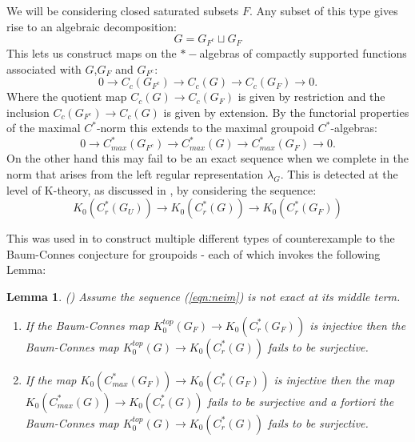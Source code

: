 \documentclass[11pt]{amsart}
\theoremstyle{plain}
\newtheorem{lemma}[theorem]{Lemma}%
\theoremstyle{definition}%
\theoremstyle{remark}%
\begin{document}
We will be considering closed saturated subsets $F$. Any subset of this type gives rise to an algebraic decomposition:
\begin{equation*}
G = G_{F^{c}}\sqcup G_{F}
\end{equation*}
This lets us construct maps on the $*-$algebras of compactly supported functions associated with $G$,$G_{F}$ and $G_{F^{c}}$:
\begin{equation*}
0 \rightarrow C_{c}(G_{F^{c}}) \rightarrow C_{c}(G) \rightarrow C_{c}(G_{F}) \rightarrow 0.
\end{equation*}
Where the quotient map $C_{c}(G) \rightarrow C_{c}(G_{F})$ is given by restriction and the inclusion $C_{c}(G_{F^{c}}) \rightarrow C_{c}(G)$ is given by extension. By the functorial properties of the maximal $C^{*}$-norm this extends to the maximal groupoid $C^{*}$-algebras:
\begin{equation*}
0 \rightarrow C_{max}^{*}(G_{F^{c}}) \rightarrow C_{max}^{*}(G) \rightarrow C_{max}^{*}(G_{F}) \rightarrow 0.
\end{equation*}
On the other hand this may fail to be an exact sequence when we complete in the norm that arises from the left regular representation $\lambda_{G}$. This is detected at the level of K-theory, as discussed in \cite{MR1911663}, by considering the sequence:
\begin{equation}\label{eqn:neim}
K_{0}(C^{*}_{r}(G_{U}))\rightarrow K_{0}(C^{*}_{r}(G)) \rightarrow K_{0}(C^{*}_{r}(G_{F}))
\end{equation}

This was used in \cite{MR1911663} to construct multiple different types of counterexample to the Baum-Connes conjecture for groupoids - each of which invokes the following Lemma:
\begin{lemma}\label{Lem:Lemma1}(\cite[Lemma 1]{MR1911663})
Assume the sequence (\ref{eqn:neim}) is not exact at its middle term.
\begin{enumerate}
\item If the Baum-Connes map $K_{0}^{top}(G_{F}) \rightarrow K_{0}(C^{*}_{r}(G_{F}))$ is injective then the Baum-Connes map $K_{0}^{top}(G) \rightarrow K_{0}(C^{*}_{r}(G))$ fails to be surjective.
\item If the map $K_{0}(C^{*}_{max}(G_{F})) \rightarrow K_{0}(C^{*}_{r}(G_{F}))$ is injective then the map $K_{0}(C^{*}_{max}(G)) \rightarrow K_{0}(C^{*}_{r}(G))$ fails to be surjective and a fortiori the Baum-Connes map $K_{0}^{top}(G) \rightarrow K_{0}(C^{*}_{r}(G))$ fails to be surjective.
\end{enumerate}
\end{lemma}
\end{document}
